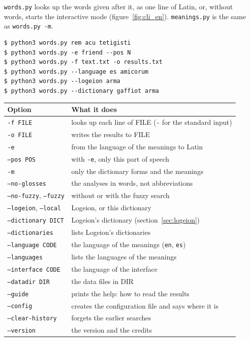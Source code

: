 \documentclass[12pt,
              article,
              oneside
              ]{memoir}
\begin{document}
%
\texttt{words.py} looks up the words given after it, as one line of Latin,
or, without words, starts the interactive mode (figure~\ref{fig:cli_en}).
\texttt{meanings.py} is the same as \texttt{words.py -m}.

\begin{verbatim}
$ python3 words.py rem acu tetigisti
$ python3 words.py -e friend --pos N
$ python3 words.py -f text.txt -o results.txt
$ python3 words.py --language es amicorum
$ python3 words.py --logeion arma
$ python3 words.py --dictionary gaffiot arma
\end{verbatim}

%
\begin{longtable}{@{}>{\raggedright}p{}p{}@{}}
\toprule
Option & What it does\\
\midrule
\endhead
\texttt{-f FILE} & looks up each line of FILE (\texttt{-} for the standard input)\\
\texttt{-o FILE} & writes the results to FILE\\
\texttt{-e} & from the language of the meanings to Latin\\
\texttt{--pos POS} & with \texttt{-e}, only this part of speech\\
\texttt{-m} & only the dictionary forms and the meanings\\
\texttt{--no-glosses} & the analyses in words, not abbreviations\\
\texttt{--no-fuzzy}, \texttt{--fuzzy} & without or with the fuzzy search\\
\texttt{--logeion}, \texttt{--local} & Logeion, or this dictionary\\
\texttt{--dictionary DICT} & Logeion's dictionary (section~\ref{sec:logeion})\\
\texttt{--dictionaries} & lists Logeion's dictionaries\\
\texttt{--language CODE} & the language of the meanings (\texttt{en}, \texttt{es})\\
\texttt{--languages} & lists the languages of the meanings\\
\texttt{--interface CODE} & the language of the interface\\
\texttt{--datadir DIR} & the data files in DIR\\
\texttt{--guide} & prints the help: how to read the results\\
\texttt{--config} & creates the configuration file and says where it is\\
\texttt{--clear-history} & forgets the earlier searches\\
\texttt{--version} & the version and the credits\\
\bottomrule
\end{longtable}
\end{document}
